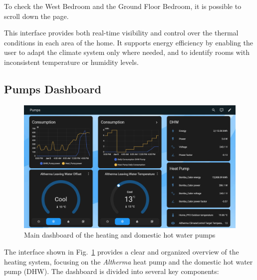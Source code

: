 \documentclass[graybox]{svmult}
\begin{document}
To check the West Bedroom and the Ground Floor Bedroom, it is possible to scroll down the page.

This interface provides both real-time visibility and control over the thermal conditions in each area of the home. It supports energy efficiency by enabling the user to adapt the climate system only where needed, and to identify rooms with inconsistent temperature or humidity levels.

\subsection{Pumps Dashboard}

\begin{figure}[H] 
	\centering
	\includegraphics[width=\textwidth]{bombas.png}
	\caption{Main dashboard of the heating and domestic hot water pumps}
	\label{fig:bombas}
\end{figure}

The interface shown in Fig.~\ref{fig:bombas} provides a clear and organized overview of the heating system, focusing on the \textit{Altherma} heat pump and the domestic hot water pump (DHW). The dashboard is divided into several key components:
\end{document}
